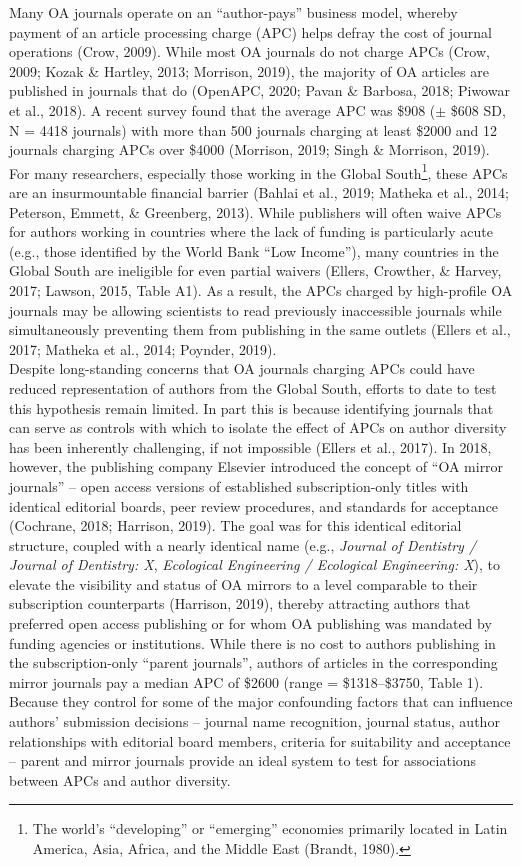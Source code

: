 \documentclass[english,man]{apa6}
\begin{document}
Many OA journals operate on an \enquote{author-pays} business model, whereby payment of an article processing charge (APC) helps defray the cost of journal operations (Crow, 2009). While most OA journals do not charge APCs (Crow, 2009; Kozak \& Hartley, 2013; Morrison, 2019), the majority of OA articles are published in journals that do (OpenAPC, 2020; Pavan \& Barbosa, 2018; Piwowar et al., 2018). A recent survey found that the average APC was \$908 (\(\pm\) \$608 SD, N = 4418 journals) with more than 500 journals charging at least \$2000 and 12 journals charging APCs over \$4000 (Morrison, 2019; Singh \& Morrison, 2019). For many researchers, especially those working in the Global South\footnote{The world's \enquote{developing} or \enquote{emerging} economies primarily located in Latin America, Asia, Africa, and the Middle East (Brandt, 1980).}, these APCs are an insurmountable financial barrier (Bahlai et al., 2019; Matheka et al., 2014; Peterson, Emmett, \& Greenberg, 2013). While publishers will often waive APCs for authors working in countries where the lack of funding is particularly acute (e.g., those identified by the World Bank \enquote{Low Income}), many countries in the Global South are ineligible for even partial waivers (Ellers, Crowther, \& Harvey, 2017; Lawson, 2015, Table A1). As a result, the APCs charged by high-profile OA journals may be allowing scientists to read previously inaccessible journals while simultaneously preventing them from publishing in the same outlets (Ellers et al., 2017; Matheka et al., 2014; Poynder, 2019).\\
Despite long-standing concerns that OA journals charging APCs could have reduced representation of authors from the Global South, efforts to date to test this hypothesis remain limited. In part this is because identifying journals that can serve as controls with which to isolate the effect of APCs on author diversity has been inherently challenging, if not impossible (Ellers et al., 2017). In 2018, however, the publishing company Elsevier introduced the concept of \enquote{OA mirror journals} -- open access versions of established subscription-only titles with identical editorial boards, peer review procedures, and standards for acceptance (Cochrane, 2018; Harrison, 2019). The goal was for this identical editorial structure, coupled with a nearly identical name (e.g., \emph{Journal of Dentistry / Journal of Dentistry: X}, \emph{Ecological Engineering / Ecological Engineering: X}), to elevate the visibility and status of OA mirrors to a level comparable to their subscription counterparts (Harrison, 2019), thereby attracting authors that preferred open access publishing or for whom OA publishing was mandated by funding agencies or institutions. While there is no cost to authors publishing in the subscription-only \enquote{parent journals}, authors of articles in the corresponding mirror journals pay a median APC of \$2600 (range = \$1318--\$3750, Table 1). Because they control for some of the major confounding factors that can influence authors' submission decisions -- journal name recognition, journal status, author relationships with editorial board members, criteria for suitability and acceptance -- parent and mirror journals provide an ideal system to test for associations between APCs and author diversity.\\
\end{document}
